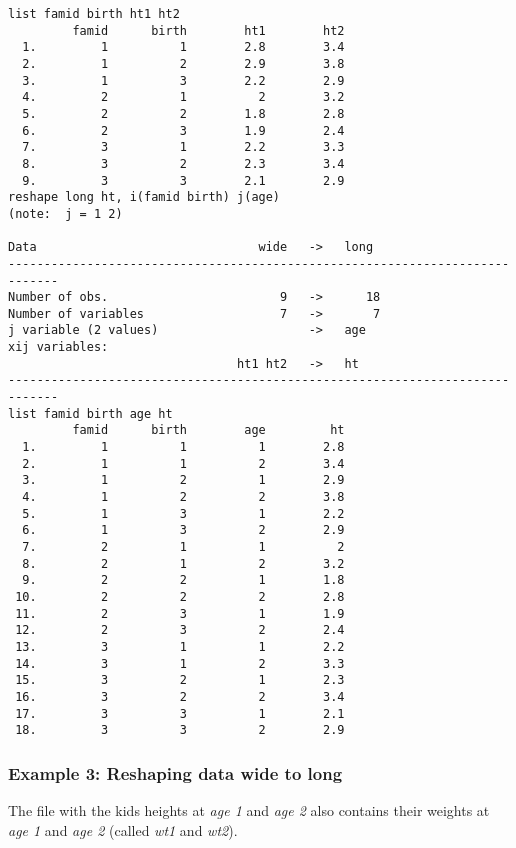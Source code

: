 \begin{lstlisting}
list famid birth ht1 ht2
         famid      birth        ht1        ht2
  1.         1          1        2.8        3.4
  2.         1          2        2.9        3.8
  3.         1          3        2.2        2.9
  4.         2          1          2        3.2
  5.         2          2        1.8        2.8
  6.         2          3        1.9        2.4
  7.         3          1        2.2        3.3
  8.         3          2        2.3        3.4
  9.         3          3        2.1        2.9
reshape long ht, i(famid birth) j(age)
(note:  j = 1 2)

Data                               wide   ->   long
-----------------------------------------------------------------------------
Number of obs.                        9   ->      18
Number of variables                   7   ->       7
j variable (2 values)                     ->   age
xij variables:
                                ht1 ht2   ->   ht
-----------------------------------------------------------------------------
list famid birth age ht
         famid      birth        age         ht
  1.         1          1          1        2.8
  2.         1          1          2        3.4
  3.         1          2          1        2.9
  4.         1          2          2        3.8
  5.         1          3          1        2.2
  6.         1          3          2        2.9
  7.         2          1          1          2
  8.         2          1          2        3.2
  9.         2          2          1        1.8
 10.         2          2          2        2.8
 11.         2          3          1        1.9
 12.         2          3          2        2.4
 13.         3          1          1        2.2
 14.         3          1          2        3.3
 15.         3          2          1        2.3
 16.         3          2          2        3.4
 17.         3          3          1        2.1
 18.         3          3          2        2.9
\end{lstlisting}

\subsubsection{Example 3: Reshaping data wide to long}

The file with the kids heights at \textit{age 1} and \textit{age 2} also contains their weights at \textit{age 1} and \textit{age 2} (called \textit{wt1} and \textit{wt2}).

